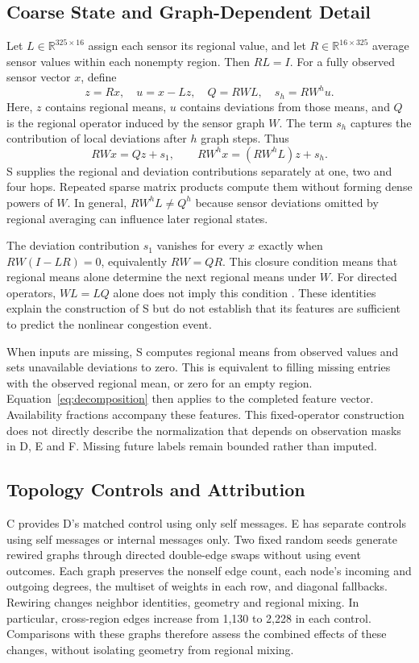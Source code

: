 \documentclass{llncs}
\begin{document}
\subsection{Coarse State and Graph-Dependent Detail}
Let $L\in\mathbb{R}^{325\times16}$ assign each sensor its regional value, and let $R\in\mathbb{R}^{16\times325}$ average sensor values within each nonempty region. Then $RL=I$. For a fully observed sensor vector $x$, define
\begin{equation}
 z=Rx,\quad u=x-Lz,\quad Q=RWL,\quad s_h=RW^hu.
\end{equation}
Here, $z$ contains regional means, $u$ contains deviations from those means, and $Q$ is the regional operator induced by the sensor graph $W$. The term $s_h$ captures the contribution of local deviations after $h$ graph steps. Thus
\begin{equation}
 RWx=Qz+s_1,\qquad RW^hx=(RW^hL)z+s_h.
\label{eq:decomposition}
\end{equation}
S supplies the regional and deviation contributions separately at one, two and four hops. Repeated sparse matrix products compute them without forming dense powers of $W$. In general, $RW^hL\neq Q^h$ because sensor deviations omitted by regional averaging can influence later regional states.

The deviation contribution $s_1$ vanishes for every $x$ exactly when $RW(I-LR)=0$, equivalently $RW=QR$. This closure condition means that regional means alone determine the next regional means under $W$. For directed operators, $WL=LQ$ alone does not imply this condition \cite{schaub}. These identities explain the construction of S but do not establish that its features are sufficient to predict the nonlinear congestion event. 

When inputs are missing, S computes regional means from observed values and sets unavailable deviations to zero. This is equivalent to filling missing entries with the observed regional mean, or zero for an empty region. Equation~\ref{eq:decomposition} then applies to the completed feature vector. Availability fractions accompany these features. This fixed-operator construction does not directly describe the normalization that depends on observation masks in D, E and F. Missing future labels remain bounded rather than imputed.

\subsection{Topology Controls and Attribution}
C provides D's matched control using only self messages. E has separate controls using self messages or internal messages only. Two fixed random seeds generate rewired graphs through directed double-edge swaps without using event outcomes. Each graph preserves the nonself edge count, each node's incoming and outgoing degrees, the multiset of weights in each row, and diagonal fallbacks. Rewiring changes neighbor identities, geometry and regional mixing. In particular, cross-region edges increase from 1,130 to 2,228 in each control. Comparisons with these graphs therefore assess the combined effects of these changes, without isolating geometry from regional mixing.
\end{document}

